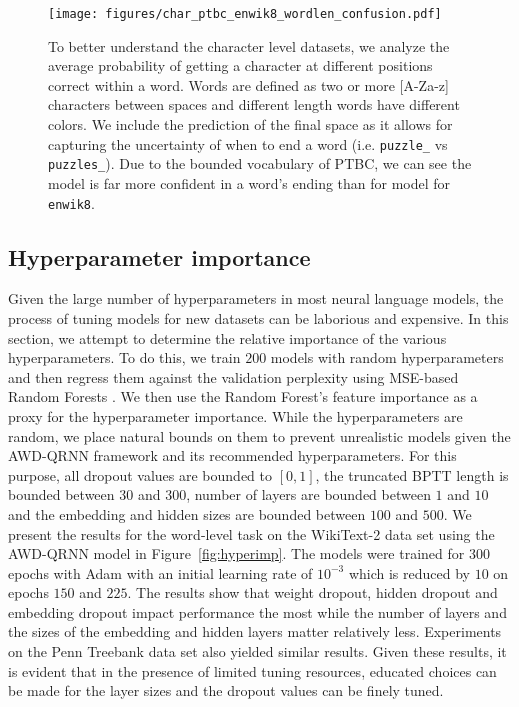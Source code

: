 \documentclass{article}
\newcommand{\enwik}{\texttt{enwik8}\xspace}
\begin{document}
\begin{figure}
\centering
\texttt{[image: figures/char\_ptbc\_enwik8\_wordlen\_confusion.pdf]}
\caption{
To better understand the character level datasets, we analyze the average probability of getting a character at different positions correct within a word.
Words are defined as two or more [A-Za-z] characters between spaces and different length words have different colors.
We include the prediction of the final space as it allows for capturing the uncertainty of when to end a word (i.e. \texttt{puzzle\_} vs \texttt{puzzles\_}).
Due to the bounded vocabulary of PTBC, we can see the model is far more confident in a word's ending than for model for \enwik.
}
\label{fig:wordlen_confusion}
\end{figure}

\subsection{Hyperparameter importance}
Given the large number of hyperparameters in most neural language models, the process of tuning models for new datasets can be laborious and expensive. In this section, we attempt to determine the relative importance of the various hyperparameters. To do this, we train $200$ models with random hyperparameters and then regress them against the validation perplexity using MSE-based Random Forests \cite{breiman2001random}. We then use the Random Forest's feature importance as a proxy for the hyperparameter importance. While the hyperparameters are random, we place natural bounds on them to prevent unrealistic models given the AWD-QRNN framework and its recommended hyperparameters. For this purpose, all dropout values are bounded to $[0,1]$, the truncated BPTT length is bounded between $30$ and $300$, number of layers are bounded between $1$ and $10$ and the embedding and hidden sizes are bounded between $100$ and $500$. We present the results for the word-level task on the WikiText-2 data set using the AWD-QRNN model in Figure~\ref{fig:hyperimp}. The models were trained for 300 epochs with Adam with an initial learning rate of $10^{-3}$ which is reduced by $10$ on epochs $150$ and $225$. The results show that weight dropout, hidden dropout and embedding dropout impact performance the most while the number of layers and the sizes of the embedding and hidden layers matter relatively less. Experiments on the Penn Treebank data set also yielded similar results. Given these results, it is evident that in the presence of limited tuning resources, educated choices can be made for the layer sizes and the dropout values can be finely tuned. 
\end{document}
